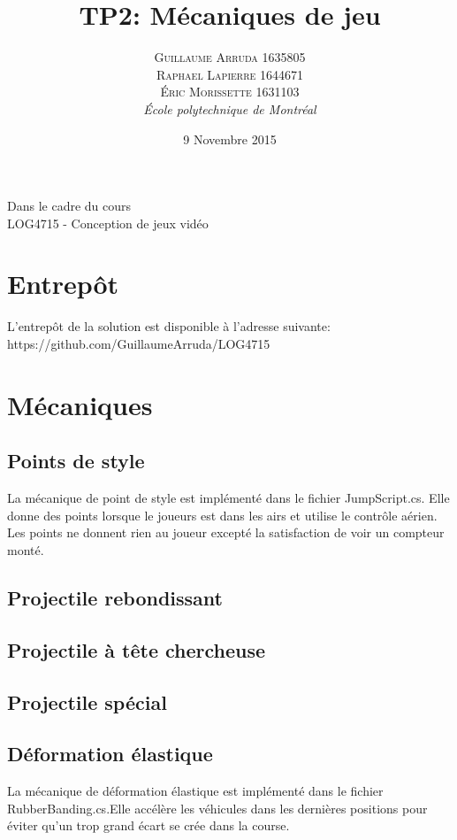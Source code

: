 \documentclass[a4paper, 12pt]{article} %
\title{TP2: Mécaniques de jeu}
\author{\textsc{Guillaume Arruda 1635805 \\ Raphael Lapierre 1644671 \\ Éric Morissette 1631103} %
\vspace{10pt}
\\{\textit{École polytechnique de Montréal}}} %
\date{9 Novembre 2015} %
\makeatletter
\renewcommand{\maketitle}{ %
\begin{center} %

\vspace*{25pt} %
{\LARGE\@title} %

\vspace{125pt} %

{\large\@author} %

\vspace{125pt} %
Dans le cadre du cours
\\LOG4715 - Conception de jeux vidéo
\vspace{125pt} %
\\\@date %
\vspace{125pt} %

\end{center}
}
\makeatother
\begin{document}
\thispagestyle{empty}
\clearpage\maketitle %
\pagebreak[4]

\setlength{\headheight}{15.0pt}
\pagestyle{fancy}
\fancyhead[C]{}

\section{Entrepôt}
L'entrepôt de la solution est disponible à l'adresse suivante: https://github.com/GuillaumeArruda/LOG4715

\section{Mécaniques}
\subsection{Points de style}
La mécanique de point de style est implémenté dans le fichier JumpScript.cs. Elle donne des points lorsque le joueurs est dans les airs et utilise le contrôle aérien. Les points ne donnent rien au joueur excepté la satisfaction de voir un compteur monté.
\subsection{Projectile rebondissant}
\subsection{Projectile à tête chercheuse}
\subsection{Projectile spécial}
\subsection{Déformation élastique}
La mécanique de déformation élastique est implémenté dans le fichier RubberBanding.cs.Elle accélère les véhicules dans les dernières positions pour éviter qu'un trop grand écart se crée dans la course.
\end{document}
